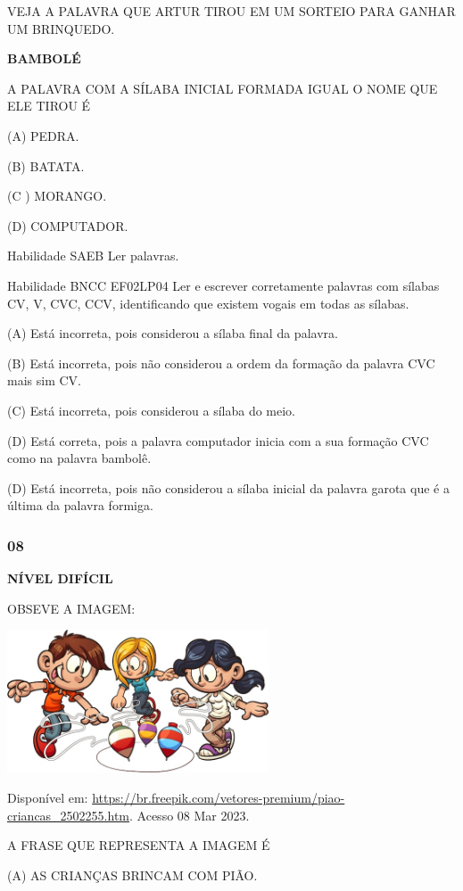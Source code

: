 VEJA A PALAVRA QUE ARTUR TIROU EM UM SORTEIO PARA GANHAR UM BRINQUEDO.

\textbf{BAMBOLÉ}

A PALAVRA COM A SÍLABA INICIAL FORMADA IGUAL O NOME QUE ELE TIROU É

(A) PEDRA.

(B) BATATA.

(C ) MORANGO.

(D) COMPUTADOR.

\protect\hypertarget{_Hlk129508691}{}{}Habilidade SAEB Ler palavras.

Habilidade BNCC EF02LP04 Ler e escrever corretamente palavras com
sílabas CV, V, CVC, CCV, identificando que existem vogais em todas as
sílabas.

(A) Está incorreta, pois considerou a sílaba final da palavra.

(B) Está incorreta, pois não considerou a ordem da formação da palavra
CVC mais sim CV.

(C) Está incorreta, pois considerou a sílaba do meio.

(D) Está correta, pois a palavra computador inicia com a sua formação
CVC como na palavra bambolê.

(D) Está incorreta, pois não considerou a sílaba inicial da palavra
garota que é a última da palavra formiga.

\subsubsection{08}\label{section-101}

\textbf{NÍVEL DIFÍCIL}

OBSEVE A IMAGEM:

\includegraphics[width=3.05095in,height=1.66841in]{media/image144.jpeg}

Disponível em:
\url{https://br.freepik.com/vetores-premium/piao-criancas_2502255.htm}.
Acesso 08 Mar 2023.

A FRASE QUE REPRESENTA A IMAGEM É

(A) AS CRIANÇAS BRINCAM COM PIÃO.

